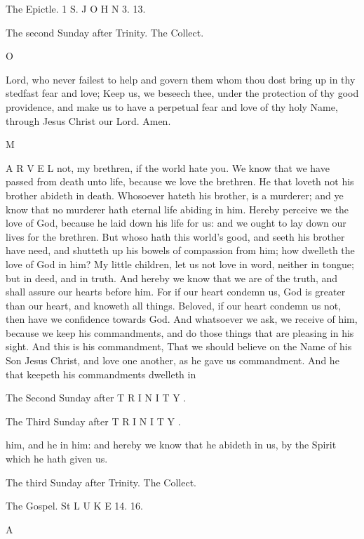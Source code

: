 The Epictle. 1 S. J O H N 3. 13.

The second Sunday after Trinity. The Collect.

O

Lord, who never failest to help and govern them whom thou dost bring up in thy stedfast fear and love; Keep us, we beseech thee, under the protection of thy good providence, and make us to have a perpetual fear and love of thy holy Name, through Jesus Christ our Lord. Amen.

M

A R V E L not, my brethren, if the world hate you. We know that we have passed from death unto life, because we love the brethren. He that loveth not his brother abideth in death. Whosoever hateth his brother, is a murderer; and ye know that no murderer hath eternal life abiding in him. Hereby perceive we the love of God, because he laid down his life for us: and we ought to lay down our lives for the brethren. But whoso hath this world’s good, and seeth his brother have need, and shutteth up his bowels of compassion from him; how dwelleth the love of God in him? My little children, let us not love in word, neither in tongue; but in deed, and in truth. And hereby we know that we are of the truth, and shall assure our hearts before him. For if our heart condemn us, God is greater than our heart, and knoweth all things. Beloved, if our heart condemn us not, then have we confidence towards God. And whatsoever we ask, we receive of him, because we keep his commandments, and do those things that are pleasing in his sight. And this is his commandment, That we should believe on the Name of his Son Jesus Christ, and love one another, as he gave us commandment. And he that keepeth his commandments dwelleth in

The Second Sunday after T R I N I T Y .

The Third Sunday after T R I N I T Y .

him, and he in him: and hereby we know that he abideth in us, by the Spirit which he hath given us.

The third Sunday after Trinity. The Collect.

The Gospel. St L U K E 14. 16.

A

